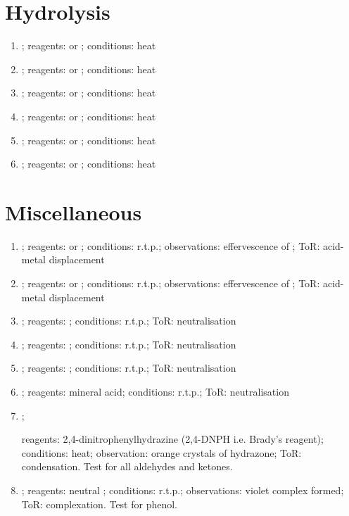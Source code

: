 \section{Hydrolysis}
\begin{enumerate}
    \item {}; reagents:  or ; conditions: heat
    \item {}; reagents:  or ; conditions: heat
    \item {}; reagents:  or ; conditions: heat
    \item {}; reagents:  or ; conditions: heat
    \item {}; reagents:  or ; conditions: heat
    \item {}; reagents:  or ; conditions: heat
\end{enumerate}
\section{Miscellaneous}
\begin{enumerate}
    \item {}; reagents:  or ; conditions: r.t.p.; observations: effervescence of ; ToR: acid-metal displacement
    \item {}; reagents:  or ; conditions: r.t.p.; observations: effervescence of ; ToR: acid-metal displacement
    \item {}; reagents: ; conditions: r.t.p.; ToR: neutralisation
    \item {}; reagents: ; conditions: r.t.p.; ToR: neutralisation
    \item {}; reagents: ; conditions: r.t.p.; ToR: neutralisation
    \item {}; reagents: mineral acid; conditions: r.t.p.; ToR: neutralisation
    \item {}; 
    
    reagents: 2,4-dinitrophenylhydrazine (2,4-DNPH i.e. Brady's reagent); conditions: heat; observation: orange crystals of hydrazone; ToR: condensation. Test for all aldehydes and ketones.
    \item {}; reagents: neutral ; conditions: r.t.p.; observations: violet complex formed; ToR: complexation. Test for phenol.
\end{enumerate}